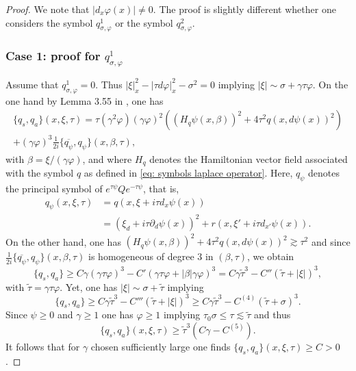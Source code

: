 \documentclass[10pt]{amsart}
\theoremstyle{plain}
\theoremstyle{definition}
\newcommand{\suff}{sufficiently\xspace}
\let\csp\gamma
\newcommand{\ovl}[1]{\overline{#1}}
\newcommand{\qconj}{q_{\sigma,\varphi}}
\newcommand{\qs}{q_{s}}
\newcommand{\qa}{q_{a}}
\begin{document}
\begin{proof}
We note that $|d_x \varphi(x)|\neq0$.
The proof is slightly different whether one considers the symbol
$\qconj^1$ or the symbol $\qconj^2$.

\subsubsection*{Case 1: proof for ${\qconj^1}$}
Assume that
$\qconj^1=0$. Thus $|\xi|_x^2-|\tau
d\varphi|_x^2-\sigma^2=0$ implying $|\xi|\sim \sigma+\csp\tau\varphi$. On the one hand by Lemma 3.55 in \cite{JGL-vol1}, one has
\begin{multline}\label{mes1}
\{\qs, \qa\}(x,\xi,\tau)
=\tau(\csp^2\varphi)(\csp\varphi)^2\left((H_{q}\psi(x,\beta))^2+4\tau^2 q(x, d\psi(x))^2\right) \\
+(\csp\varphi)^3\frac{1}{2i}\{\ovl{q_{\psi}}, q_{\psi}\}(x,\beta,\tau),
\end{multline}
with $\beta = \xi /(\csp\varphi)$, and where $H_q$ denotes the
Hamiltonian vector field associated with the symbol $q$ as defined in
\eqref{eq: symbols laplace operator}. Here, $q_\psi$ denotes the
principal symbol of $e^{\tau \psi} Q e^{-\tau \psi}$, that is,
\begin{align*}
q_\psi (x,\xi, \tau)
&= q(x,\xi + i \tau d_x \psi(x))\\
&= (\xi_d + i \tau \partial_d \psi(x))^2 + r(x,\xi' +
i \tau d_{x'} \psi(x)).
\end{align*}
On the other hand, one has $(H_{q}\psi(x,\beta))^2+4\tau^2 q(x,
d\psi(x))^2\gtrsim \tau^2$ and since
$\frac{1}{2i}\{\ovl{q_{\psi}}, q_{\psi}\}(x,\beta,\tau)$ is
homogeneous of degree $3$ in $(\beta,\tau)$, we obtain
\begin{equation*}
\{\qs, \qa\}
\geq C \csp(\csp\tau\varphi)^3
-C' (\csp\tau\varphi+|\beta|\csp\varphi)^3
=C\csp\tilde{\tau}^3
-C''(\tilde{\tau}+|\xi|)^3,
\end{equation*}
with $\tilde{\tau}=\csp\tau\varphi$.
Yet, one has $|\xi|\sim\sigma+\tilde{\tau}$ implying
\begin{equation*}
\{\qs, \qa\}
\geq C\csp\tilde{\tau}^3
-C'''(\tilde{\tau}+|\xi|)^3
\geq C \csp\tilde{\tau}^3-C^{(4)}(\tilde{\tau}+\sigma)^3.
\end{equation*}
Since $\psi\geq 0$ and $\csp\geq 1$ one has $\varphi\geq1$ implying
$\tau_0 \sigma \leq\tau\lesssim\tilde{\tau}$ and thus
\begin{equation*}
\{\qs, \qa\}(x,\xi,\tau)\geq \tilde{\tau}^3(C\csp-C^{(5)}).
\end{equation*}
It follows that for $\csp$ chosen \suff large one finds $\{\qs, \qa\}(x,\xi,\tau)\geq C>0$.


\end{proof}
\end{document}
